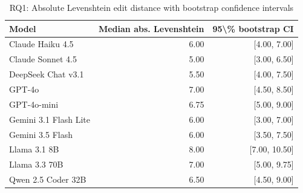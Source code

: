 \begin{table}[htbp]
\centering
{\small
\begin{tabular}{l|rr}
\toprule
\textbf{Model} & \textbf{Median abs. Levenshtein} & \textbf{95\textbackslash{}\% bootstrap CI} \\
\midrule
Claude Haiku 4.5 & 6.00 & [4.00, 7.00] \\
Claude Sonnet 4.5 & 5.00 & [3.00, 6.50] \\
DeepSeek Chat v3.1 & 5.50 & [4.00, 7.50] \\
GPT-4o & 7.00 & [4.50, 8.50] \\
GPT-4o-mini & 6.75 & [5.00, 9.00] \\
Gemini 3.1 Flash Lite & 6.00 & [3.00, 7.00] \\
Gemini 3.5 Flash & 6.00 & [3.50, 7.50] \\
Llama 3.1 8B & 8.00 & [7.00, 10.50] \\
Llama 3.3 70B & 7.00 & [5.00, 9.75] \\
Qwen 2.5 Coder 32B & 6.50 & [4.50, 9.00] \\
\bottomrule
\end{tabular}
}
\caption{RQ1: Absolute Levenshtein edit distance with bootstrap confidence intervals}
\label{tab:rq1-edit-distance}
\end{table}